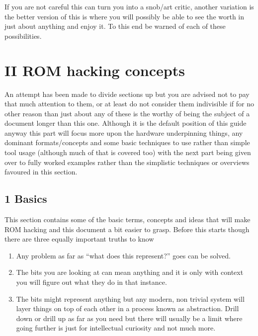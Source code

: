 \documentclass[
]{book}
\providecommand{\tightlist}{%
  \setlength{\itemsep}{0pt}\setlength{\parskip}{0pt}}
\begin{document}
If you are not careful this can turn you into a snob/art critic, another variation is the better version of this is where you will possibly be able to see the worth in just about anything and enjoy it. To this end be warned of each of these possibilities.

\hypertarget{part-ii-rom-hacking-concepts}{%
\part{II ROM hacking concepts}\label{part-ii-rom-hacking-concepts}}

An attempt has been made to divide sections up but you are advised not to pay that much attention to them, or at least do not consider them indivisible if for no other reason than just about any of these is the worthy of being the subject of a document longer than this one. Although it is the default position of this guide anyway this part will focus more upon the hardware underpinning things, any dominant formats/concepts and some basic techniques to use rather than simple tool usage (although much of that is covered too) with the next part being given over to fully worked examples rather than the simplistic techniques or overviews favoured in this section.

\hypertarget{basics}{%
\chapter{1 Basics}\label{basics}}

This section contains some of the basic terms, concepts and ideas that will make ROM hacking and this document a bit easier to grasp. Before this starts though there are three equally important truths to know

\begin{enumerate}
\def\labelenumi{\arabic{enumi}.}
\tightlist
\item
  Any problem as far as ``what does this represent?'' goes can be solved.
\item
  The bits you are looking at can mean anything and it is only with context you will figure out what they do in that instance.
\item
  The bits might represent anything but any modern, non trivial system will layer things on top of each other in a process known as abstraction. Drill down or drill up as far as you need but there will usually be a limit where going further is just for intellectual curiosity and not much more.
\end{enumerate}
\end{document}
